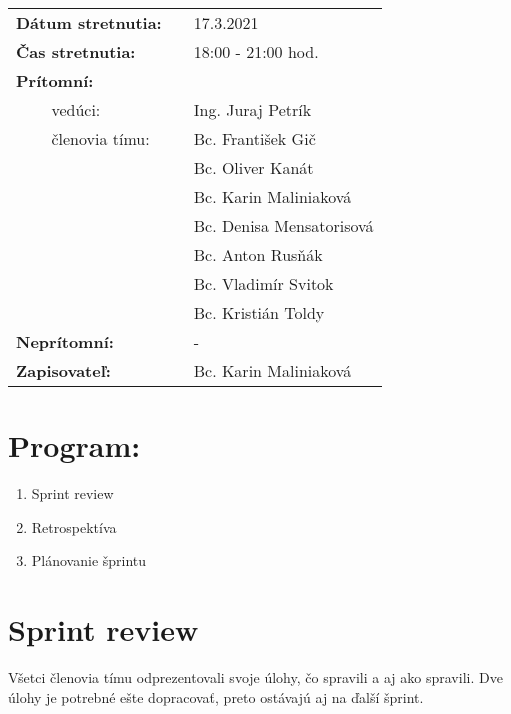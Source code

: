 \documentclass{article}
\begin{document}
    

    \begin{table}[h]
        \begin{tabular}{lllll}
            \multicolumn{3}{l}{\textbf{Dátum stretnutia:}} & & 17.3.2021 \\
            \multicolumn{3}{l}{\textbf{Čas stretnutia:}} & & 18:00 - 21:00 hod. \\
            \multicolumn{3}{l}{\textbf{Prítomní:}} \\
            & & vedúci: & & Ing. Juraj Petrík \\
            & & členovia tímu: & & Bc. František Gič  \\
            & & & & Bc. Oliver Kanát \\
            & & & & Bc. Karin Maliniaková \\
            & & & & Bc. Denisa Mensatorisová \\
            & & & & Bc. Anton Rusňák \\
            & & & & Bc. Vladimír Svitok \\
            & & & & Bc. Kristián Toldy \\
            \multicolumn{3}{l}{\textbf{Neprítomní:}} & & -\\
            \multicolumn{3}{l}{\textbf{Zapisovateľ:}} & & Bc. Karin Maliniaková \\
        \end{tabular}
        \label{tab:grades}
    \end{table}

    \section*{Program:}

    \begin{enumerate}
        \item Sprint review
        \item Retrospektíva
        \item Plánovanie šprintu
    \end{enumerate}

    \section*{Sprint review}

        \textnormal {Všetci členovia tímu odprezentovali svoje úlohy, čo spravili a aj ako spravili. Dve úlohy je potrebné ešte dopracovať, preto ostávajú aj na ďalší šprint.}
\end{document}

